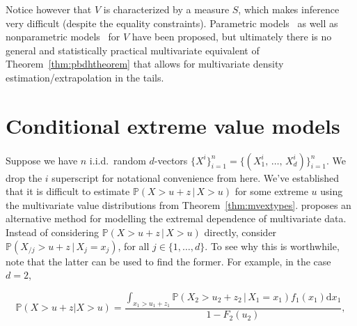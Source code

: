 \documentclass[11pt,twoside,openany]{book}
\renewcommand{\vec}[1]{\boldsymbol{#1}}
\newcommand{\prob}{\mathbb{P}}
\newcommand{\md}{\mathrm{d}}
\numberwithin{Theorem}{chapter}
\numberwithin{Definition}{chapter}
\numberwithin{Lemma}{chapter}
\numberwithin{Algorithm}{chapter}
\numberwithin{equation}{chapter}
\begin{document}


Notice however that $V$ is characterized by a measure $S$, which makes
inference very difficult (despite the equality constraints).
Parametric models~\citep{tawn1990modelling}
as well as nonparametric models~\citep{marcon2017multivariate}
for $V$
have been proposed,
but ultimately there is no
general and statistically practical multivariate equivalent of
Theorem~\ref{thm:pbdhtheorem} that allows for multivariate density estimation/extrapolation in
the tails.

\section{Conditional extreme value models}

Suppose we have $n$ i.i.d.\ random $d$-vectors
$\{X^i\}_{i=1}^n = \{(X^i_1,\,\ldots,\,X^i_d)\}_{i=1}^n$.
We drop the $i$ superscript for notational convenience from here. We've
established that it is difficult to estimate $\prob(X > u + z\,|\,X > u)$
for some extreme $u$ using the multivariate value distributions from
Theorem~\ref{thm:mvextypes}. \cite{heffernan2004conditional} proposes an
alternative method for modelling the extremal dependence of multivariate data.
Instead of considering $\prob(X> u + z\, |\, X > u)$ directly, consider
$\prob(X_{/j} > u + z\, |\, X_j = x_j)$, for all $j\in \{1,\ldots,d\}$.
To see why this is worthwhile, note that
the latter can be used to find the former. For example, in the case $d=2$,

\begin{equation}\label{eq:thresh_to_ht}
    \prob(X > u + z | X > u)
    = \frac{\int_{x_1 > u_1+z_1} \prob(X_2 > u_2 + z_2\, |\, X_1 =x_1)f_{1}(x_1)\md x_{1}}{1-F_2(u_2)},
  \end{equation}
\end{document}
